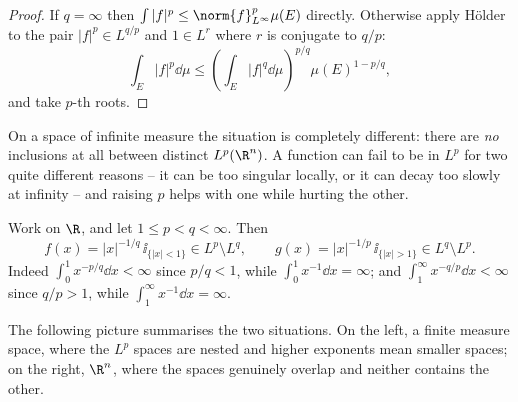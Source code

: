 \begin{proof}
	If $q = \infty$ then $\int |f|^p \le \norm{f}_{L^\infty}^p \mu(E)$ directly. Otherwise apply H\"older to the pair $|f|^p \in L^{q/p}$ and $1 \in L^r$ where $r$ is conjugate to $q/p$:
	$$\int_E |f|^p \dd\mu \le \left( \int_E |f|^{q} \dd \mu \right)^{p/q} \mu(E)^{1 - p/q},$$
	and take $p$-th roots.
\end{proof}

On a space of infinite measure the situation is completely different: there are \emph{no} inclusions at all between distinct $L^p(\R^n)$. A function can fail to be in $L^p$ for two quite different reasons -- it can be too singular locally, or it can decay too slowly at infinity -- and raising $p$ helps with one while hurting the other.

\begin{example}\label{ex:noinclusion}
	Work on $\R$, and let $1 \le p < q < \infty$. Then
	$$f(x) = |x|^{-1/q}\, \ii_{\{|x| < 1\}} \in L^p \setminus L^q, \qquad g(x) = |x|^{-1/p} \, \ii_{\{|x| > 1\}} \in L^q \setminus L^p.$$
	Indeed $\int_0^1 x^{-p/q} \dd x < \infty$ since $p/q < 1$, while $\int_0^1 x^{-1}\dd x = \infty$; and $\int_1^\infty x^{-q/p} \dd x < \infty$ since $q/p > 1$, while $\int_1^\infty x^{-1} \dd x = \infty$.
\end{example}

The following picture summarises the two situations. On the left, a finite measure space, where the $L^p$ spaces are nested and higher exponents mean smaller spaces; on the right, $\R^n$, where the spaces genuinely overlap and neither contains the other.

\begin{center}
\end{center}

